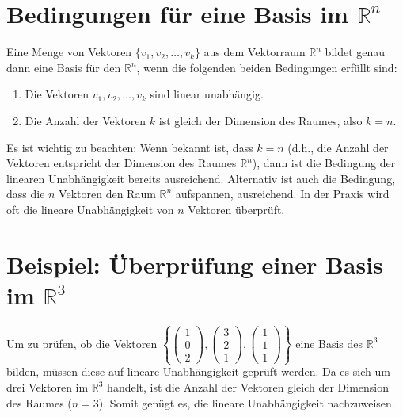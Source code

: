 \section{Bedingungen für eine Basis im $\mathbb{R}^n$}

Eine Menge von Vektoren $\{v_1, v_2, \dots, v_k\}$ aus dem Vektorraum $\mathbb{R}^n$ bildet genau dann eine Basis für den $\mathbb{R}^n$, wenn die folgenden beiden Bedingungen erfüllt sind:
\begin{enumerate}
    \item Die Vektoren $v_1, v_2, \dots, v_k$ sind linear unabhängig.
    \item Die Anzahl der Vektoren $k$ ist gleich der Dimension des Raumes, also $k=n$.
\end{enumerate}
Es ist wichtig zu beachten: Wenn bekannt ist, dass $k=n$ (d.h., die Anzahl der Vektoren entspricht der Dimension des Raumes $\mathbb{R}^n$), dann ist die Bedingung der linearen Unabhängigkeit bereits ausreichend. Alternativ ist auch die Bedingung, dass die $n$ Vektoren den Raum $\mathbb{R}^n$ aufspannen, ausreichend. In der Praxis wird oft die lineare Unabhängigkeit von $n$ Vektoren überprüft.

\section{Beispiel: Überprüfung einer Basis im $\mathbb{R}^3$}

Um zu prüfen, ob die Vektoren $\left\{\begin{pmatrix}
    1 \\ 0 \\ 2
\end{pmatrix}, \begin{pmatrix}
    3 \\ 2 \\ 1
\end{pmatrix}, \begin{pmatrix}
    1 \\ 1 \\ 1
\end{pmatrix}\right\}$ eine Basis des $\mathbb{R}^3$ bilden, müssen diese auf lineare Unabhängigkeit geprüft werden. Da es sich um drei Vektoren im $\mathbb{R}^3$ handelt, ist die Anzahl der Vektoren gleich der Dimension des Raumes ($n=3$). Somit genügt es, die lineare Unabhängigkeit nachzuweisen.

